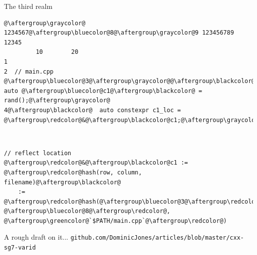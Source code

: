 \documentclass[xcolor=dvipsnames]{beamer}
\begin{document}
\begin{frame}[fragile]{The third realm}
\begin{lstlisting}
@\aftergroup\graycolor@ 1234567@\aftergroup\bluecolor@8@\aftergroup\graycolor@9 123456789 12345
         10        20
1
2  // main.cpp
@\aftergroup\bluecolor@3@\aftergroup\graycolor@@\aftergroup\blackcolor@  auto @\aftergroup\bluecolor@c1@\aftergroup\blackcolor@ = rand();@\aftergroup\graycolor@
4@\aftergroup\blackcolor@  auto constexpr c1_loc = @\aftergroup\redcolor@&@\aftergroup\blackcolor@c1;@\aftergroup\graycolor@
\end{lstlisting}

~

\begin{lstlisting}
// reflect location
@\aftergroup\redcolor@&@\aftergroup\blackcolor@c1 := @\aftergroup\redcolor@hash(row, column, filename)@\aftergroup\blackcolor@
    := @\aftergroup\redcolor@hash(@\aftergroup\bluecolor@3@\aftergroup\redcolor@, @\aftergroup\bluecolor@8@\aftergroup\redcolor@, @\aftergroup\greencolor@`$PATH/main.cpp`@\aftergroup\redcolor@)
\end{lstlisting}

\vspace{5mm}
\footnotesize{A rough draft on it...}\newline
\footnotesize{\texttt{github.com/DominicJones/articles/blob/master/cxx-sg7-varid}}
\end{frame}


\begin{frame}[plain]
  \titlepage
\end{frame}
\end{document}
